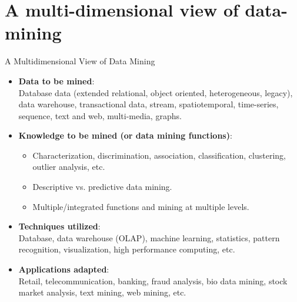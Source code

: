 \section{A multi-dimensional view of data-mining}

\begin{frame}{A Multidimensional View of Data Mining}
	\begin{itemize}
		\item \textbf{Data to be mined}:\\
		\small{Database data (extended relational, object oriented, 
		heterogeneous, legacy), data warehouse, transactional data, stream, 
		spatiotemporal, time-series, sequence, text and web, multi-media, 
		graphs.}
		\item \textbf{Knowledge to be mined (or data mining functions)}:\\
		\begin{itemize}
			\item Characterization, discrimination, association, 
			classification, clustering, outlier analysis, etc.
			\item Descriptive vs. predictive data mining.
			\item Multiple/integrated functions and mining at multiple levels.
		\end{itemize}
		\item \textbf{Techniques utilized}:\\
		\small{Database, data warehouse (OLAP), machine learning, statistics, 
		pattern recognition, visualization, high performance computing, etc.}
		\item \textbf{Applications adapted}:\\
		\small{Retail, telecommunication, banking, fraud analysis, bio data 
		mining, stock market analysis, text mining, web mining, etc.}
	\end{itemize}
\end{frame}